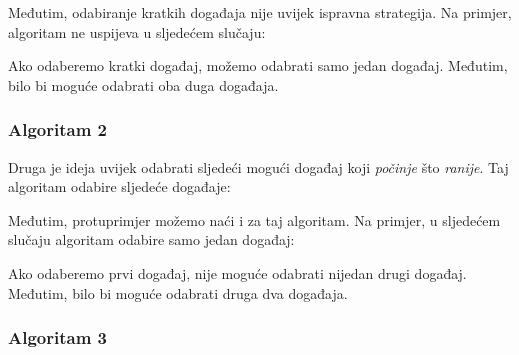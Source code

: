 Međutim, odabiranje kratkih događaja nije uvijek
ispravna strategija. Na primjer, algoritam ne uspijeva
u sljedećem slučaju:
\begin{center}
\end{center}
Ako odaberemo kratki događaj, možemo odabrati samo jedan događaj.
Međutim, bilo bi moguće odabrati oba duga događaja.

\subsubsection*{Algoritam 2}

Druga je ideja uvijek odabrati sljedeći mogući
događaj koji \emph{počinje} što \emph{ranije}.
Taj algoritam odabire sljedeće događaje:
\begin{center}
\end{center}

Međutim, protuprimjer možemo naći
i za taj algoritam.
Na primjer, u sljedećem slučaju
algoritam odabire samo jedan događaj:
\begin{center}
\end{center}
Ako odaberemo prvi događaj, nije moguće
odabrati nijedan drugi događaj.
Međutim, bilo bi moguće odabrati
druga dva događaja.

\subsubsection*{Algoritam 3}

